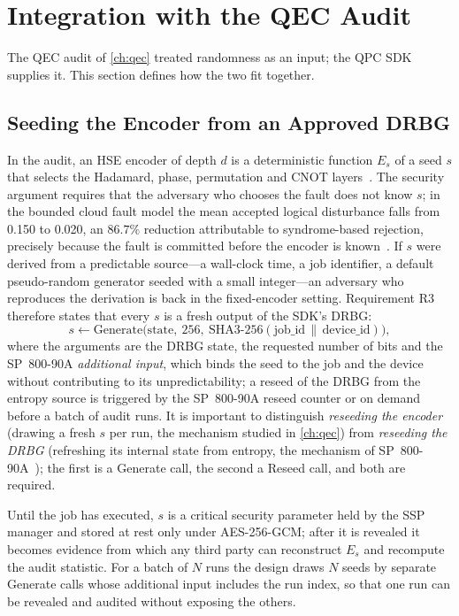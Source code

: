 \section{Integration with the QEC Audit}\label{sec:pqc:integration}

The QEC audit of \cref{ch:qec} treated randomness as an input; the QPC SDK supplies it. This section defines how the two fit together.

\subsection{Seeding the Encoder from an Approved DRBG}\label{sec:pqc:seed}

In the audit, an HSE encoder of depth $d$ is a deterministic function $E_s$ of a seed $s$ that selects the Hadamard, phase, permutation and CNOT layers~\cite{guo2026qecaudit}. The security argument requires that the adversary who chooses the fault does not know $s$; in the bounded cloud fault model the mean accepted logical disturbance falls from 0.150 to 0.020, an $86.7\%$ reduction attributable to syndrome-based rejection, precisely because the fault is committed before the encoder is known~\cite{guo2026qecaudit}. If $s$ were derived from a predictable source---a wall-clock time, a job identifier, a default pseudo-random generator seeded with a small integer---an adversary who reproduces the derivation is back in the fixed-encoder setting. Requirement R3 therefore states that every $s$ is a fresh output of the SDK's DRBG:
\begin{equation}\label{eq:pqc:seed}
s \leftarrow \mathrm{Generate}\bigl(\mathrm{state},\ 256,\ \mathrm{SHA3\text{-}256}(\mathrm{job\_id} \,\|\, \mathrm{device\_id})\bigr),
\end{equation}
where the arguments are the DRBG state, the requested number of bits and the SP~800-90A \emph{additional input}, which binds the seed to the job and the device without contributing to its unpredictability; a reseed of the DRBG from the entropy source is triggered by the SP~800-90A reseed counter or on demand before a batch of audit runs. It is important to distinguish \emph{reseeding the encoder} (drawing a fresh $s$ per run, the mechanism studied in \cref{ch:qec}) from \emph{reseeding the DRBG} (refreshing its internal state from entropy, the mechanism of SP~800-90A~\cite{nist2015sp80090a}); the first is a Generate call, the second a Reseed call, and both are required.

Until the job has executed, $s$ is a critical security parameter held by the SSP manager and stored at rest only under AES-256-GCM; after it is revealed it becomes evidence from which any third party can reconstruct $E_s$ and recompute the audit statistic. For a batch of $N$ runs the design draws $N$ seeds by separate Generate calls whose additional input includes the run index, so that one run can be revealed and audited without exposing the others.

